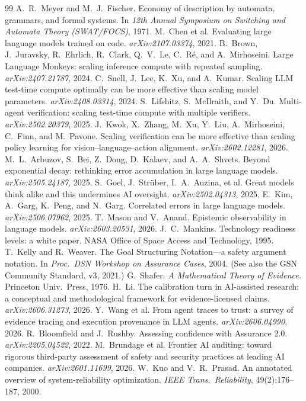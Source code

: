 \documentclass[11pt]{article}
\theoremstyle{definition}
\theoremstyle{remark}
\begin{document}
\begin{thebibliography}{99}
 A.~R.~Meyer and M.~J.~Fischer. Economy of description by automata, grammars,
and formal systems. In \emph{12th Annual Symposium on Switching and Automata Theory (SWAT/FOCS)}, 1971.
 M.~Chen et al. Evaluating large language models trained on code.
\emph{arXiv:2107.03374}, 2021.
 B.~Brown, J.~Juravsky, R.~Ehrlich, R.~Clark, Q.~V.~Le, C.~R\'e, and A.~Mirhoseini.
Large Language Monkeys: scaling inference compute with repeated sampling. \emph{arXiv:2407.21787}, 2024.
 C.~Snell, J.~Lee, K.~Xu, and A.~Kumar. Scaling LLM test-time compute optimally can
be more effective than scaling model parameters. \emph{arXiv:2408.03314}, 2024.
 S.~Lifshitz, S.~McIlraith, and Y.~Du. Multi-agent verification: scaling test-time
compute with multiple verifiers. \emph{arXiv:2502.20379}, 2025.
 J.~Kwok, X.~Zhang, M.~Xu, Y.~Liu, A.~Mirhoseini, C.~Finn, and M.~Pavone.
Scaling verification can be more effective than scaling policy learning for vision--language--action
alignment. \emph{arXiv:2602.12281}, 2026.
 M.~L.~Arbuzov, S.~Bei, Z.~Dong, D.~Kalaev, and A.~A.~Shvets. Beyond exponential
decay: rethinking error accumulation in large language models. \emph{arXiv:2505.24187}, 2025.
 S.~Goel, J.~Str\"uber, I.~A.~Auzina, et al. Great models think alike and this
undermines AI oversight. \emph{arXiv:2502.04313}, 2025.
 E.~Kim, A.~Garg, K.~Peng, and N.~Garg. Correlated errors in large language models.
\emph{arXiv:2506.07962}, 2025.
 T.~Mason and V.~Anand. Epistemic observability in language models.
\emph{arXiv:2603.20531}, 2026.
 J.~C.~Mankins. Technology readiness levels: a white paper. NASA Office of Space
Access and Technology, 1995.
 T.~Kelly and R.~Weaver. The Goal Structuring Notation---a safety argument notation. In
\emph{Proc.\ DSN Workshop on Assurance Cases}, 2004. (See also the GSN Community Standard, v3, 2021.)
 G.~Shafer. \emph{A Mathematical Theory of Evidence.} Princeton Univ.\ Press, 1976.
 H.~Li. The calibration turn in AI-assisted research: a conceptual and methodological
framework for evidence-licensed claims. \emph{arXiv:2606.31273}, 2026.
 Y.~Wang et al. From agent traces to trust: a survey of evidence tracing and
execution provenance in LLM agents. \emph{arXiv:2606.04990}, 2026.
 R.~Bloomfield and J.~Rushby. Assessing confidence with Assurance 2.0.
\emph{arXiv:2205.04522}, 2022.
 M.~Brundage et al. Frontier AI auditing: toward rigorous third-party assessment of
safety and security practices at leading AI companies. \emph{arXiv:2601.11699}, 2026.
 W.~Kuo and V.~R.~Prasad. An annotated overview of system-reliability optimization.
\emph{IEEE Trans.\ Reliability}, 49(2):176--187, 2000.
\end{thebibliography}
\end{document}
